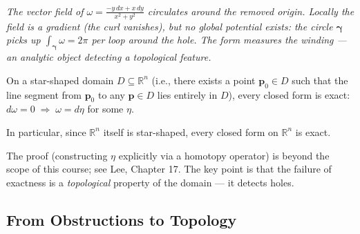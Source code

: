 \documentclass[11pt]{report}
\newcommand{\figcap}[1]{\\[1.5mm]\parbox{0.92\textwidth}{\small\itshape #1}}
\newcommand{\R}{\mathbb{R}}
\begin{document}
\begin{center}
%
\figcap{The vector field of $\omega = \frac{-y\,dx + x\,dy}{x^2+y^2}$ circulates around the removed origin. Locally the field is a gradient (the curl vanishes), but no global potential exists: the circle $\boldsymbol{\gamma}$ picks up $\int_{\boldsymbol{\gamma}}\omega = 2\pi$ per loop around the hole. The form measures the winding --- an analytic object detecting a topological feature.}
\end{center}

\begin{proposition}
On a star-shaped domain $D \subseteq \R^n$ (i.e., there exists a point $\mathbf{p}_0 \in D$ such that the line segment from $\mathbf{p}_0$ to any $\mathbf{p} \in D$ lies entirely in $D$), every closed form is exact: $d\omega = 0 \;\Rightarrow\; \omega = d\eta$ for some $\eta$.

In particular, since $\R^n$ itself is star-shaped, every closed form on $\R^n$ is exact.
\end{proposition}

The proof (constructing $\eta$ explicitly via a homotopy operator) is beyond the scope of this course; see Lee, Chapter 17. The key point is that the failure of exactness is a \textit{topological} property of the domain --- it detects holes.

\subsection*{From Obstructions to Topology}
\end{document}
